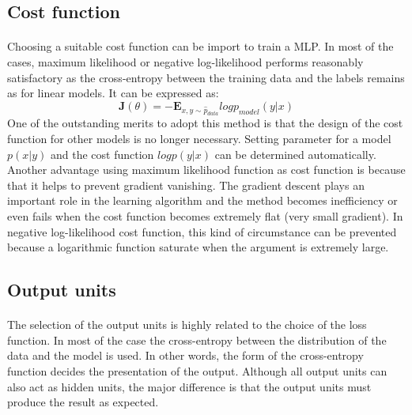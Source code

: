 \subsection{Cost function}
\paragraph{}
Choosing a suitable cost function can be import to train a MLP.
In most of the cases, maximum likelihood or negative log-likelihood performs reasonably satisfactory as the cross-entropy between the training data and the labels remains as for linear models.
It can be expressed as:
\begin{equation}
    \mathbf{J}(\theta) = -\mathbf{E}_{x,y\sim \hat{p}_{data}}  log   p_{model} (y|x)
    \label{lr_eq:ml_MLE}
\end{equation}
%
One of the outstanding merits to adopt this method is that the design of the cost function for other models is no longer necessary.
Setting parameter for a model $p(x|y)$ and the cost function $log p(y|x)$ can be determined automatically.
Another advantage using maximum likelihood function as cost function is because that it helps to prevent gradient vanishing.
The gradient descent plays an important role in the learning algorithm and the method becomes inefficiency or even fails when the cost function becomes extremely flat (very small gradient).
In negative log-likelihood cost function, this kind of circumstance can be prevented because a logarithmic function saturate when the argument is extremely large.

\subsection{Output units}
\paragraph{}
The selection of the output units is highly related to the choice of the loss function.
In most of the case the cross-entropy between the distribution of the data and the model is used.
In other words, the form of the cross-entropy function decides the presentation of the output.
Although all output units can also act as hidden units, the major difference is that the output units must produce the result as expected.
